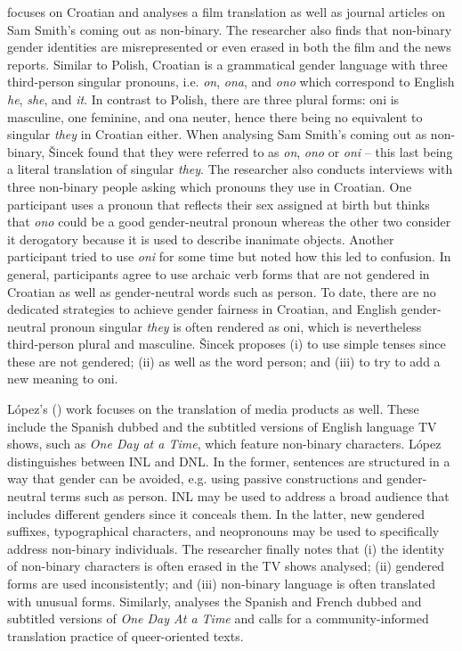 \textcite{vsincek2020ona} focuses on Croatian and analyses a film translation as well as journal articles on Sam Smith's coming out as non-binary. The researcher also finds that non-binary gender identities are misrepresented or even erased in both the film and the news reports. Similar to Polish, Croatian is a grammatical gender language with three third-person singular pronouns, i.e. \textit{on}, \textit{ona}, and \textit{ono} which correspond to English \textit{he}, \textit{she}, and \textit{it}. In contrast to Polish, there are three plural forms: oni is masculine, one feminine, and ona neuter, hence there being no equivalent to singular \textit{they} in Croatian either. When analysing Sam Smith's coming out as non-binary, Šincek found that they were referred to as \textit{on}, \textit{ono} or \textit{oni} -- this last being a literal translation of singular \textit{they}. The researcher also conducts interviews with three non-binary people asking which pronouns they use in Croatian. One participant uses a pronoun that reflects their sex assigned at birth but thinks that \textit{ono} could be a good gender-neutral pronoun whereas the other two consider it derogatory because it is used to describe inanimate objects. Another participant tried to use \textit{oni} for some time but noted how this led to confusion. In general, participants agree to use archaic verb forms that are not gendered in Croatian as well as gender-neutral words such as person. To date, there are no dedicated strategies to achieve gender fairness in Croatian, and English gender-neutral pronoun singular \textit{they} is often rendered as oni, which is nevertheless third-person plural and masculine. Šincek proposes (i) to use simple tenses since these are not gendered; (ii) as well as the word person; and (iii) to try to add a new meaning to oni. 

López's (\cite*{lopez2019tu,lopez2022trans}) work focuses on the translation of media products as well. These include the Spanish dubbed and the subtitled versions of English language TV shows, such as \textit{One Day at a Time}, which feature non-binary characters. López distinguishes between INL and DNL. In the former, sentences are structured in a way that gender can be avoided, e.g. using passive constructions and gender-neutral terms such as person. INL may be used to address a broad audience that includes different genders since it conceals them. In the latter, new gendered suffixes, typographical characters, and neopronouns may be used to specifically address non-binary individuals. The researcher finally notes that (i) the identity of non-binary characters is often erased in the TV shows analysed; (ii) gendered forms are used inconsistently; and (iii) non-binary language is often translated with unusual forms. Similarly, \textcite{attig2023call} analyses the Spanish and French dubbed and subtitled versions of \textit{One Day At a Time} and calls for a community-informed translation practice of queer-oriented texts.

